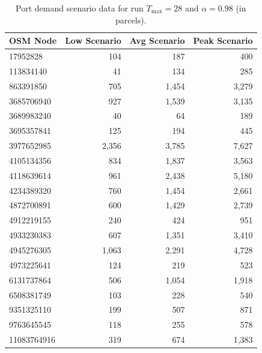 \documentclass[12pt]{article}
\begin{document}
\begin{table}[htbp]
  \centering
  \caption{Port demand scenario data for run \(T_{\max}=28\) and \(\alpha=0.98\) (in parcels).}
  \label{anx:port_demand_scenarios_t28_a098}
  \begin{tabular}{lrrr}
    \toprule
    \textbf{OSM Node} & \textbf{Low Scenario} & \textbf{Avg Scenario} & \textbf{Peak Scenario} \\
    \midrule
    17952828          & 104                   & 187                   & 400                    \\
    113834140         & 41                    & 134                   & 285                    \\
    863391850         & 705                   & 1,454                 & 3,279                  \\
    3685706940        & 927                   & 1,539                 & 3,135                  \\
    3689983240        & 40                    & 64                    & 189                    \\
    3695357841        & 125                   & 194                   & 445                    \\
    3977652985        & 2,356                 & 3,785                 & 7,627                  \\
    4105134356        & 834                   & 1,837                 & 3,563                  \\
    4118639614        & 961                   & 2,438                 & 5,180                  \\
    4234389320        & 760                   & 1,454                 & 2,661                  \\
    4872700891        & 600                   & 1,429                 & 2,739                  \\
    4912219155        & 240                   & 424                   & 951                    \\
    4933230383        & 607                   & 1,351                 & 3,410                  \\
    4945276305        & 1,063                 & 2,291                 & 4,728                  \\
    4973225641        & 124                   & 219                   & 523                    \\
    6131737864        & 506                   & 1,054                 & 1,918                  \\
    6508381749        & 103                   & 228                   & 540                    \\
    9351325110        & 199                   & 507                   & 871                    \\
    9763645545        & 118                   & 255                   & 578                    \\
    11083764916       & 319                   & 674                   & 1,383                  \\
    \bottomrule
  \end{tabular}
\end{table}
\end{document}
